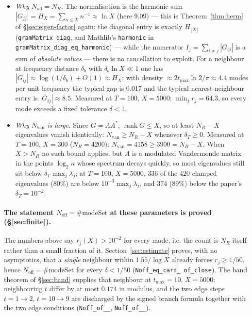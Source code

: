 \documentclass[11pt,a4paper]{article}
\newcommand{\lb}{\_\allowbreak}
\newcommand{\code}[1]{\texttt{#1}}
\newcommand{\itemization}[1]{\begin{itemize}[leftmargin=1.4em,itemsep=1pt,topsep=2pt]#1\end{itemize}}
\theoremstyle{definition}
\theoremstyle{remark}
\begin{document}
\itemization{
\item \emph{Why $N_{\mathrm{off}}=N_R$.}  The normalisation is the harmonic sum
  $|G_{jj}|=H_X=\sum_{n\le X}n^{-1}\approx\ln X$ (here $9.09$) --- this is
  Theorem~\ref{thm:herm} of \S\ref{sec:eigen-factor} again: the diagonal entry is exactly
  $H_{\lfloor X\rfloor}$ (\code{gramMatrix\lb diag}, and Mathlib's \code{harmonic} in
  \code{gramMatrix\lb diag\lb eq\lb harmonic}) --- while the numerator
  $I_j=\sum_{i\ne j}|G_{ij}|$ is a sum of \emph{absolute values} --- there is no cancellation
  to exploit.  For a neighbour at frequency distance $\delta_b$ with
  $\delta_b\ln X\ll1$ one has $|G_{ij}|\approx\log(1/\delta_b)+O(1)\approx H_X$; with density
  $\approx2t_{\max}\ln2/\pi\approx4.4$ modes per unit frequency the typical gap is $0.017$
  and the typical nearest-neighbour entry is $|G_{ij}|\approx8.5$.  Measured at
  $T=100$, $X=5000$: $\min_j r_j=64.3$, so every mode exceeds a fixed tolerance
  $\delta<1$.
\item \emph{Why $N_{\mathrm{van}}$ is large.}  Since $G=AA^{*}$, $\operatorname{rank}G\le X$,
  so at least $N_R-X$ eigenvalues vanish identically: $N_{\mathrm{van}}\ge N_R-X$ whenever
  $\delta_T\ge0$.  Measured at $T=100$, $X=300$ ($N_R=4200$): $N_{\mathrm{van}}=4158\ge3900
  =N_R-X$.  When $X>N_R$ no such bound applies, but $A$ is a modulated Vandermonde matrix
  in the points $\log_2 n$ whose spectrum decays quickly, so most eigenvalues still sit below
  $\delta_T\max_j\lambda_j$; at $T=100$, $X=5000$, $336$ of the $420$ clamped eigenvalues
  (80\%) are below $10^{-3}\max_j\lambda_j$, and $374$ (89\%) below the paper's
  $\delta_T=10^{-2}$.
}

\paragraph{The statement $N_{\mathrm{off}}=\#\mathrm{modeSet}$ at these parameters is proved
(\S\ref{sec:finite}).}  The numbers above say $r_j(X)>10^{-2}$ for every mode, i.e. the count
is $N_R$ itself rather than a small fraction of it.  Section~\ref{sec:estimate} proves, with no
asymptotics, that a \emph{single} neighbour within $1.55/\log X$ already forces $r_j\ge1/50$,
hence $N_{\mathrm{off}}=\#\mathrm{modeSet}$ for every $\delta<1/50$ (\code{Noff\lb eq\lb card\lb
of\lb close}).  The band theorem of \S\ref{sec:band} supplies that neighbour at
$t_{\max}=10$, $X=5000$: neighbouring $t$ differ by at most $0.174$ in modulus, and the two
edge steps $t=1\to2$, $t=10\to9$ are discharged by the signed branch formula together with the
two edge conditions (\code{Noff\lb of\lb 10\lb 100}, \code{Noff\lb of\lb 10\lb 500}).
\end{document}
